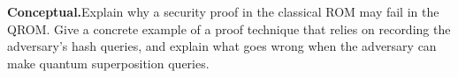 \begin{prob}
\label{prob:ch02-qrom}
\textbf{Conceptual.}\enspace Explain why a security proof in the classical ROM may fail in the QROM.  Give a concrete example of a proof technique that relies on recording the adversary's hash queries, and explain what goes wrong when the adversary can make quantum superposition queries.
\end{prob}
